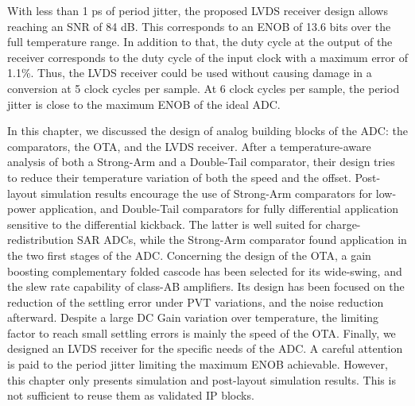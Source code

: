 With less than 1 ps of period jitter, the proposed LVDS receiver design allows reaching an SNR of 84 dB. This corresponds to an ENOB of 13.6 bits over the full temperature range. In addition to that, the duty cycle at the output of the receiver corresponds to the duty cycle of the input clock with a maximum error of 1.1\%. Thus, the LVDS receiver could be used without causing damage in a conversion at 5 clock cycles per sample. At 6 clock cycles per sample, the period jitter is close to the maximum ENOB of the ideal ADC\@.

In this chapter, we discussed the design of analog building blocks of the ADC\@: the comparators, the OTA, and the LVDS receiver. After a temperature-aware analysis of both a Strong-Arm and a Double-Tail comparator, their design tries to reduce their temperature variation of both the speed and the offset. Post-layout simulation results encourage the use of Strong-Arm comparators for low-power application, and Double-Tail comparators for fully differential application sensitive to the differential kickback. The latter is well suited for charge-redistribution SAR ADCs, while the Strong-Arm comparator found application in the two first stages of the ADC\@.
Concerning the design of the OTA, a gain boosting complementary folded cascode has been selected for its wide-swing, and the slew rate capability of class-AB amplifiers. Its design has been focused on the reduction of the settling error under PVT variations, and the noise reduction afterward. Despite a large DC Gain variation over temperature, the limiting factor to reach small settling errors is mainly the speed of the OTA\@.
Finally, we designed an LVDS receiver for the specific needs of the ADC\@. A careful attention is paid to the period jitter limiting the maximum ENOB achievable.
However, this chapter only presents simulation and post-layout simulation results. This is not sufficient to reuse them as validated IP blocks.

